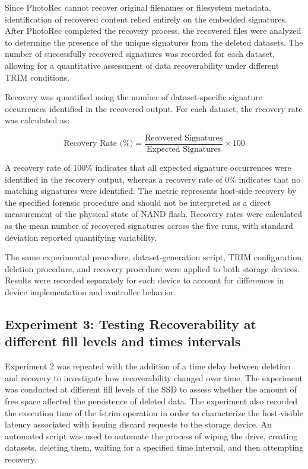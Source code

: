 Since PhotoRec cannot recover original filenames or filesystem metadata, identification of recovered content relied entirely on the embedded signatures. After PhotoRec 
completed the recovery process, the recovered files were analyzed to determine the presence of the unique signatures from the deleted datasets. The number of 
successfully recovered signatures was recorded for each dataset, allowing for a quantitative assessment of data recoverability under different TRIM conditions.

Recovery was quantified using the number of dataset-specific signature occurrences identified in the recovered output. For each dataset, the recovery rate was 
calculated as:

\[
\text{Recovery Rate (\%)} =
\frac{\text{Recovered Signatures}}{\text{Expected Signatures}}
\times 100
\]

A recovery rate of 100\% indicates that all expected signature occurrences were identified in the recovery output, whereas a recovery rate of 0\% indicates that no 
matching signatures were identified. The metric represents host-side recovery by the specified forensic procedure and should not be interpreted as a direct measurement 
of the physical state of NAND flash. Recovery rates were calculated as the mean number of recovered signatures across the five runs, with standard deviation 
reported quantifying variability.

The same experimental procedure, dataset-generation script, TRIM configuration, deletion procedure, and recovery procedure were applied to both storage devices. 
Results were recorded separately for each device to account for differences in device implementation and controller behavior.

\subsection{Experiment 3: Testing Recoverability at different fill levels and times intervals}

Experiment 2 was repeated with the addition of a time delay between deletion and recovery to investigate how recoverability changed over time. The experiment was 
conducted at different fill levels of the SSD to assess whether the amount of free space affected the persistence of deleted data. The experiment also recorded the 
execution time of the fstrim operation in order to characterize the host-visible latency associated with issuing discard requests to the storage device. An automated
script was used to automate the process of wiping the drive, creating datasets, deleting them, waiting for a specified time interval, and then attempting recovery. 

